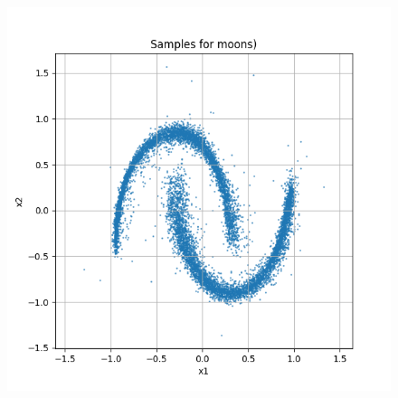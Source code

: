 \documentclass[a4paper,12pt]{article}
\begin{document}
\begin{figure}[h]
\begin{minipage}{0.3\textwidth}
  \end{minipage}
  \begin{minipage}{0.3\textwidth}
      \centering
      \includegraphics[width=\linewidth]{"images/Samples for ddpm_2_50_0.0001_0.02_moons.png"}
  \end{minipage}

  \vspace{0.5cm}


\end{figure}
\end{document}
